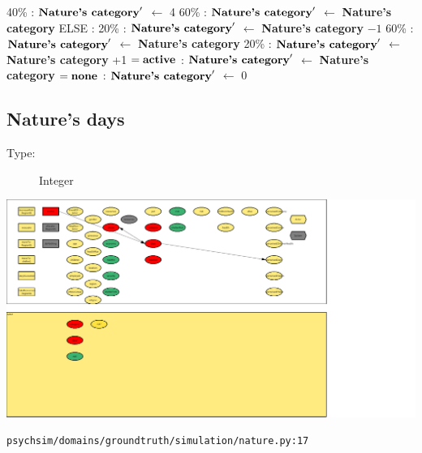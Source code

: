 \documentclass{article}%
\begin{document}
\begin{flushleft}
\hspace*{10em}%
40\%%
: %
$\mbox{\textbf{Nature's category}} '$%
$\leftarrow$%
4%
\linebreak%
\hspace*{10em}%
60\%%
: %
$\mbox{\textbf{Nature's category}} '$%
$\leftarrow$%
\textbf{Nature's category}%
\linebreak%
\hspace*{8em}%
ELSE %
: %
\linebreak%
\hspace*{10em}%
20\%%
: %
$\mbox{\textbf{Nature's category}} '$%
$\leftarrow$%
\textbf{Nature's category}%
${-}1$%
\linebreak%
\hspace*{10em}%
60\%%
: %
$\mbox{\textbf{Nature's category}} '$%
$\leftarrow$%
\textbf{Nature's category}%
\linebreak%
\hspace*{10em}%
20\%%
: %
$\mbox{\textbf{Nature's category}} '$%
$\leftarrow$%
\textbf{Nature's category}%
+1%
\linebreak%
\hspace*{2em}%
$= \mbox{\textbf{active}}$%
: %
$\mbox{\textbf{Nature's category}} '$%
$\leftarrow$%
\textbf{Nature's category}%
\linebreak%
\hspace*{2em}%
$= \mbox{\textbf{none}}$%
: %
$\mbox{\textbf{Nature's category}} '$%
$\leftarrow$%
0%
\end{flushleft}

%
\subsection{Nature's days}%
\label{subsec:Nature's days}%
\begin{description}%
\item[Type:]%
Integer%
\end{description}%
\includegraphics[width=\textwidth]{images/daysOfNature.png}%
\begin{flushleft}%
\verb|psychsim/domains/groundtruth/simulation/nature.py:17|%
\end{flushleft}%
\end{document}
